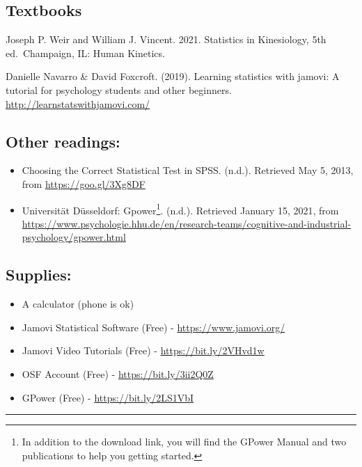 \documentclass[11pt,]{article}
\providecommand{\tightlist}{%
  \setlength{\itemsep}{0pt}\setlength{\parskip}{0pt}}
\begin{document}
\hypertarget{textbook}{%
\subsection{Textbooks}\label{textbook}}

Joseph P. Weir and William J. Vincent. 2021. Statistics in Kinesiology,
5th ed.~Champaign, IL: Human Kinetics.

Danielle Navarro \& David Foxcroft. (2019). Learning statistics with
jamovi: A tutorial for psychology students and other beginners.
\url{http://learnstatswithjamovi.com/}

\hypertarget{other-readings}{%
\subsection{Other readings:}\label{other-readings}}

\begin{itemize}
\tightlist
\item
  Choosing the Correct Statistical Test in SPSS. (n.d.). Retrieved May
  5, 2013, from \url{https://goo.gl/3Xg8DF}
\item
  Universität Düsseldorf: Gpower\footnote{In addition to the download
    link, you will find the GPower Manual and two publications to help
    you getting started.}. (n.d.). Retrieved January 15, 2021, from
  \url{https://www.psychologie.hhu.de/en/research-teams/cognitive-and-industrial-psychology/gpower.html}
\end{itemize}

\hypertarget{supplies}{%
\subsection{Supplies:}\label{supplies}}

\begin{itemize}
\tightlist
\item
  A calculator (phone is ok)
\item
  Jamovi Statistical Software (Free) - \url{https://www.jamovi.org/}
\item
  Jamovi Video Tutorials (Free) - \url{https://bit.ly/2VHvd1w}
\item
  OSF Account (Free) - \url{https://bit.ly/3ii2Q0Z}
\item
  GPower (Free) - \url{https://bit.ly/2LS1VbI}
\end{itemize}

\begin{center}\rule{0.5\linewidth}{0.5pt}\end{center}
\end{document}
